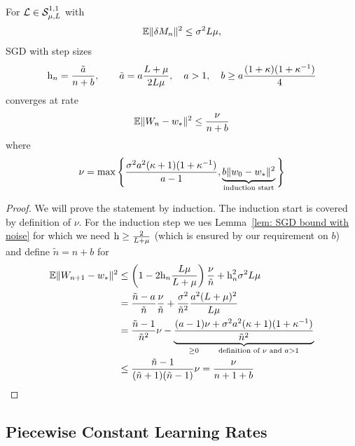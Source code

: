 \begin{theorem}
	For \(\mathcal{L}\in\mathcal{S}^{1,1}_{{\mu},{L}}\) with
	\begin{align*}
		\mathbb{E}\|\delta M_n\|^2 \le \sigma^2 L\mu,
	\end{align*}
	SGD with step sizes
	\begin{align*}
		\text{h}_n = \frac{\tilde{a}}{n+b},
		\qquad \tilde{a} =  a\frac{L+\mu}{2L\mu},
		\quad a > 1,
		\quad b \ge a\frac{(1+\kappa)(1+\kappa^{-1})}{4}
	\end{align*}
	converges at rate
	\begin{align*}
		\mathbb{E}\|W_n - w_*\|^2
		\le \frac{\nu}{n+b}
	\end{align*}
	where
	\begin{align*}
		\nu = \max\Bigg\{
			\frac{\sigma^2a^2(\kappa+1)(1+\kappa^{-1})}{a-1},
			\underbrace{
				b\|w_0 - w_*\|^2
			}_{\text{induction start}}
		\Bigg\}
	\end{align*}
\end{theorem}
\begin{proof}
	We will prove the statement by induction. The induction start is covered by
	definition of \(\nu\). For the induction step we ues Lemma~\ref{lem: SGD
	bound with noise} for which we need \(\text{h} \ge \tfrac{2}{L+\mu}\)
	(which is ensured by our requirement on \(b\)) and define \(\tilde{n}=n+b\)
	for
	\begin{align*}
		\mathbb{E}\|W_{n+1}-w_*\|^2
		&\le \left(1-2\text{h}_n \frac{L\mu}{L+\mu}\right)\frac{\nu}{\tilde{n}}
		+ \text{h}_n^2 \sigma^2 L\mu\\
		&= \frac{\tilde{n} - a}{\tilde{n}}\frac{\nu}{\tilde{n}}
		+ \frac{\sigma^2}{\tilde{n}^2}\frac{a^2(L+\mu)^2}{L\mu}\\
		&= \frac{\tilde{n} - 1}{\tilde{n}^2}\nu
		- \underbrace{\frac{(a -1)\nu + \sigma^2 a^2(\kappa+1)(1+\kappa^{-1})}{\tilde{n}^2}}_{
			\ge 0\qquad \text{definition of \(\nu\) and } a>1
		}\\
		&\le \frac{\tilde{n}-1}{(\tilde{n}+1)(\tilde{n}-1)}\nu = \frac{\nu}{n+1+b}
		\qedhere
	\end{align*}
\end{proof}

\subsection{Piecewise Constant Learning Rates}

